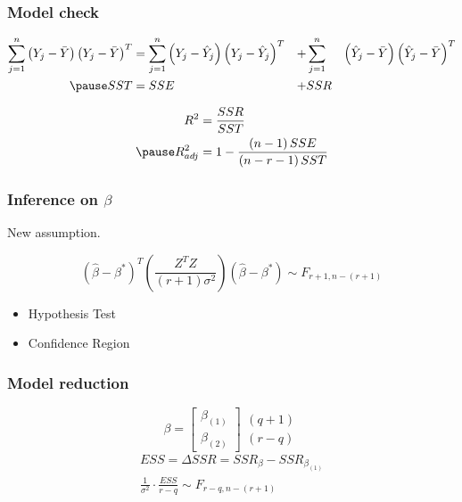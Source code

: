 \documentclass[aspectratio=169,10pt,t]{beamer}
\begin{document}
\begin{frame}[t]
	\frametitle{Model check}
	
	\[
		\begin{aligned}
			\sum^{n}_{j=1} 
			\left( Y_j -\bar{Y}   \right)
			\left( Y_j -\bar{Y}    \right) ^{T}
			&=
			\sum^{n}_{j=1} 
			\left( Y_j -\hat{Y}_{j}  \right)
			\left( Y_j -\hat{Y}_{j}  \right)^{T}
			&+
			&\sum^{n}_{j=1}& 
			\left( \hat{Y}_{j} - \bar{Y}  \right) 
			\left( \hat{Y}_{j} - \bar{Y}  \right) ^{T} \\
			\pause
			SST &= SSE &+ &SSR
		\end{aligned}
	\] 

	\[
	 \begin{aligned}
		 R^{2} &= \frac{SSR}{SST} \\
		 \pause
		 R^{2}_{adj} & = 1 - \frac{ \left( n-1 \right) SSE}{ \left( n-r-1 \right) SST} 
	 \end{aligned}
	\] 
\end{frame}

\begin{frame}[t]
	\frametitle{Inference on $\beta$}

	New assumption.


	\[
		\left( \hat{\beta} - \beta^{*}\right) ^{T}
		\left( \frac{Z^{T}Z}{ \left( r+1 \right) \sigma^{2}}   \right) 
		\left( \hat{\beta}  -\beta^{*}\right) 
		\sim
		F_{r+1,n- \left( r+1 \right) }
	\] 

	\pause
	\begin{itemize}
		\item Hypothesis Test
		\item Confidence Region
	\end{itemize}

	
\end{frame}




\begin{frame}[t]
	\frametitle{Model reduction}

	\[
	\beta
	=
	\begin{bmatrix}
		\beta_{ \left( 1 \right) }\\
		\beta_{ \left( 2 \right) }
	\end{bmatrix}
	\begin{matrix}
		\left( q+1 \right) \\
		\left( r-q \right) 
	\end{matrix}
	\] 
	\pause
	\[
		\begin{gathered}
		ESS = \Delta SSR =
		SSR_{\beta} 
		-
		SSR_{\beta_{ \left( 1 \right) }} \\
		\frac{1}{ \sigma^{2}} 
		\cdot
		\frac{ESS}{r-q} 
		\sim
		F_{r-q,n- \left( r+1 \right) }
		\end{gathered}
	\]

\end{frame}
\end{document}
